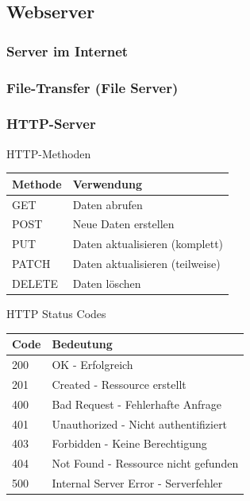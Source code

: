 \pagebreak

\subsection{Webserver}

\subsubsection{Server im Internet}

\subsubsection{File-Transfer (File Server)}

\subsubsection{HTTP-Server}

\begin{theorem}{HTTP-Methoden}
    \begin{center}
    \begin{tabular}{|l|l|}
    \hline
    Methode & Verwendung \\
    \hline
    GET & Daten abrufen \\
    \hline
    POST & Neue Daten erstellen \\
    \hline
    PUT & Daten aktualisieren (komplett) \\
    \hline
    PATCH & Daten aktualisieren (teilweise) \\
    \hline
    DELETE & Daten löschen \\
    \hline
    \end{tabular}
    \end{center}
\end{theorem}

\begin{corollary}{HTTP Status Codes}
    \begin{center}
    \begin{tabular}{|l|l|}
    \hline
    Code & Bedeutung \\
    \hline
    200 & OK - Erfolgreich \\
    \hline
    201 & Created - Ressource erstellt \\
    \hline
    400 & Bad Request - Fehlerhafte Anfrage \\
    \hline
    401 & Unauthorized - Nicht authentifiziert \\
    \hline
    403 & Forbidden - Keine Berechtigung \\
    \hline
    404 & Not Found - Ressource nicht gefunden \\
    \hline
    500 & Internal Server Error - Serverfehler \\
    \hline
    \end{tabular}
    \end{center}
\end{corollary}

